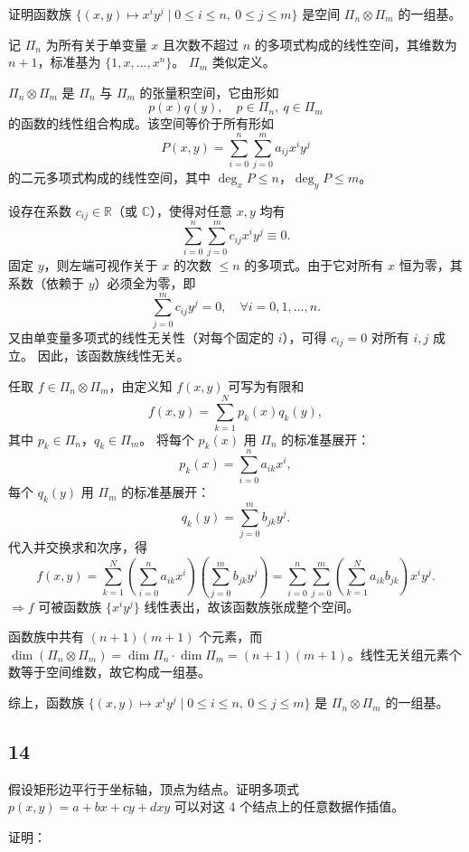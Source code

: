 \documentclass{article}
\begin{document}
证明函数族 \(\{(x, y) \mapsto x^i y^j \mid 0 \leq i \leq n,\ 0 \leq j \leq m\}\) 是空间 \(\Pi_n \otimes \Pi_m\) 的一组基。

记 \(\Pi_n\) 为所有关于单变量 \(x\) 且次数不超过 \(n\) 的多项式构成的线性空间，其维数为 \(n+1\)，标准基为 \(\{1, x, \dots, x^n\}\)。  
\(\Pi_m\) 类似定义。

\(\Pi_n \otimes \Pi_m\) 是 \(\Pi_n\) 与 \(\Pi_m\) 的张量积空间，它由形如  
\[
p(x)q(y), \quad p \in \Pi_n,\ q \in \Pi_m
\]  
的函数的线性组合构成。该空间等价于所有形如  
\[
P(x, y) = \sum_{i=0}^n \sum_{j=0}^m a_{ij} x^i y^j
\]  
的二元多项式构成的线性空间，其中 \(\deg_x P \leq n\)，\(\deg_y P \leq m\)。

设存在系数 \(c_{ij} \in \mathbb{R}\)（或 \(\mathbb{C}\)），使得对任意 \(x, y\) 均有  
\[
\sum_{i=0}^n \sum_{j=0}^m c_{ij} x^i y^j \equiv 0. \tag{1}
\]  
固定 \(y\)，则左端可视作关于 \(x\) 的次数 \(\leq n\) 的多项式。由于它对所有 \(x\) 恒为零，其系数（依赖于 \(y\)）必须全为零，即  
\[
\sum_{j=0}^m c_{ij} y^j = 0, \quad \forall i = 0, 1, \dots, n.
\]  
又由单变量多项式的线性无关性（对每个固定的 \(i\)），可得 \(c_{ij} = 0\) 对所有 \(i,j\) 成立。  
因此，该函数族线性无关。

任取 \(f \in \Pi_n \otimes \Pi_m\)，由定义知 \(f(x, y)\) 可写为有限和  
\[
f(x, y) = \sum_{k=1}^N p_k(x) q_k(y),
\]  
其中 \(p_k \in \Pi_n\)，\(q_k \in \Pi_m\)。  
将每个 \(p_k(x)\) 用 \(\Pi_n\) 的标准基展开：  
\[
p_k(x) = \sum_{i=0}^n a_{ik} x^i,
\]  
每个 \(q_k(y)\) 用 \(\Pi_m\) 的标准基展开：  
\[
q_k(y) = \sum_{j=0}^m b_{jk} y^j.
\]  
代入并交换求和次序，得  
\[
f(x, y) = \sum_{k=1}^N \left( \sum_{i=0}^n a_{ik} x^i \right) \left( \sum_{j=0}^m b_{jk} y^j \right)
= \sum_{i=0}^n \sum_{j=0}^m \left( \sum_{k=1}^N a_{ik} b_{jk} \right) x^i y^j.
\]  
 \(\Rightarrow f\) 可被函数族 \(\{x^i y^j\}\) 线性表出，故该函数族张成整个空间。

函数族中共有 \((n+1)(m+1)\) 个元素，而 \(\dim(\Pi_n \otimes \Pi_m) = \dim \Pi_n \cdot \dim \Pi_m = (n+1)(m+1)\)。线性无关组元素个数等于空间维数，故它构成一组基。

综上，函数族 \(\{(x, y) \mapsto x^i y^j \mid 0 \leq i \leq n,\ 0 \leq j \leq m\}\) 是 \(\Pi_n \otimes \Pi_m\) 的一组基。

\subsection*{14}
假设矩形边平行于坐标轴，顶点为结点。证明多项式 \( p(x,y)=a+bx+cy+dxy \) 可以对这 4 个结点上的任意数据作插值。

证明：
\end{document}
